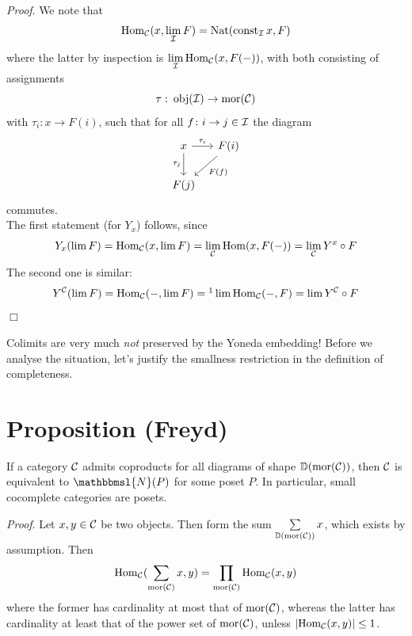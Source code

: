         \emph{Proof}. We note that
        \begin{equation*}
            \operatorname{Hom}_{\mathcal{C}}(x, \lim\limits_{\mathcal{I}}F) = \operatorname{Nat}(\operatorname{const}_{\mathcal{I}}x, F)
        \end{equation*}
        where the latter by inspection is $\lim\limits_{\mathcal{I}} \operatorname{Hom}_{\mathcal{C}}(x, F(-))$, with both consisting of assignments
        \begin{equation*}
            \tau \,\colon \operatorname{obj}(\mathcal{I}) \to \operatorname{mor}(\mathcal{C})
        \end{equation*}
        with $\tau_i \colon x \to F(i)$, such that for all $f \colon i \to j \in \mathcal{I}$ the diagram
        \begin{equation*}
            \begin{tikzcd}[column sep=small]
                x \arrow[r, "\tau_i"] \arrow[d, "\tau_j"'] & F(i) \arrow[ld, "F(f)"] \\
                F(j)                                       &                        
            \end{tikzcd}
        \end{equation*}
        commutes.\\
        The first statement (for $Y_x$) follows, since
        \begin{equation*}
            Y_x(\lim F) = \operatorname{Hom}_{\mathcal{C}}(x, \lim F) = \lim\limits_{\mathcal{C}} \operatorname{Hom}(x, F(-)) = \lim\limits_{\mathcal{C}} Y^x \circ F
        \end{equation*}
        The second one is similar:
        \begin{equation*}
            Y^{\Cc}(\lim F) = \Hom_{\Cc}(-, \lim F) =\footnotemark \lim \Hom_{\Cc}(-, F) = \lim Y^{\Cc} \circ F
        \end{equation*}
        \hfill$\Box$

        Colimits are very much \emph{not} preserved by the Yoneda embedding! Before we analyse the situation, let's justify the smallness restriction in the definition of completeness.
    \section{Proposition (Freyd)}
        If a category $\mathcal{C}$ admits coproducts for all diagrams of shape $\mathbb{D}(\operatorname{mor}(\mathcal{C}))$, then $\mathcal{C}$ is equivalent to $\mathbbmsl{N}(P)$ for some poset $P$. In particular, small cocomplete categories are posets.
        \smallskip

        \emph{Proof}. Let $x, y \in \mathcal{C}$ be two objects. Then form the sum $\sum\limits_{\mathbb{D}(\operatorname{mor}(\mathcal{C}))} x$, which exists by assumption. Then
        \begin{equation*}
            \operatorname{Hom}_{\mathcal{C}}(\sum\limits_{\operatorname{mor}(\mathcal{C})}x, y) = \prod\limits_{\operatorname{mor}(\mathcal{C})}\operatorname{Hom}_{\mathcal{C}}(x, y)
        \end{equation*}
        where the former has cardinality at most that of $\operatorname{mor}(\mathcal{C})$, whereas the latter has cardinality at least that of the power set of $\operatorname{mor}(\mathcal{C})$, unless $\left| \operatorname{Hom}_{\mathcal{C}} (x, y) \right| \leq 1$.
        

